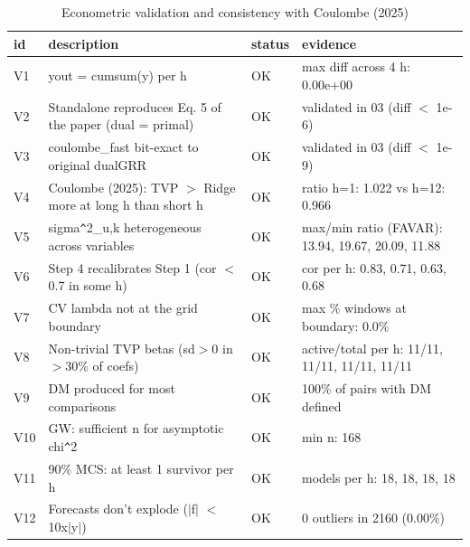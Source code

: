 \begin{table}[ht]
\centering
\begin{tabular}{llll}
  \hline
id & description & status & evidence \\ 
  \hline
V1 & yout = cumsum(y) per h & OK & max diff across 4 h: 0.00e+00 \\ 
  V2 & Standalone reproduces Eq. 5 of the paper (dual = primal) & OK & validated in 03 (diff $<$ 1e-6) \\ 
  V3 & coulombe\_fast bit-exact to original dualGRR & OK & validated in 03 (diff $<$ 1e-9) \\ 
  V4 & Coulombe (2025): TVP $>$ Ridge more at long h than short h & OK & ratio h=1: 1.022 vs h=12: 0.966 \\ 
  V5 & sigma\verb|^|2\_u,k heterogeneous across variables & OK & max/min ratio (FAVAR): 13.94, 19.67, 20.09, 11.88 \\ 
  V6 & Step 4 recalibrates Step 1 (cor $<$ 0.7 in some h) & OK & cor per h: 0.83, 0.71, 0.63, 0.68 \\ 
  V7 & CV lambda not at the grid boundary & OK & max \% windows at boundary: 0.0\% \\ 
  V8 & Non-trivial TVP betas (sd$>$0 in $>$30\% of coefs) & OK & active/total per h: 11/11, 11/11, 11/11, 11/11 \\ 
  V9 & DM produced for most comparisons & OK & 100\% of pairs with DM defined \\ 
  V10 & GW: sufficient n for asymptotic chi\verb|^|2 & OK & min n: 168 \\ 
  V11 & 90\% MCS: at least 1 survivor per h & OK & models per h: 18, 18, 18, 18 \\ 
  V12 & Forecasts don't explode ($|$f$|$ $<$ 10x$|$y$|$) & OK & 0 outliers in 2160 (0.00\%) \\ 
   \hline
\end{tabular}
\caption{Econometric validation and consistency with Coulombe (2025)} 
\label{tab:validation}
\end{table}
